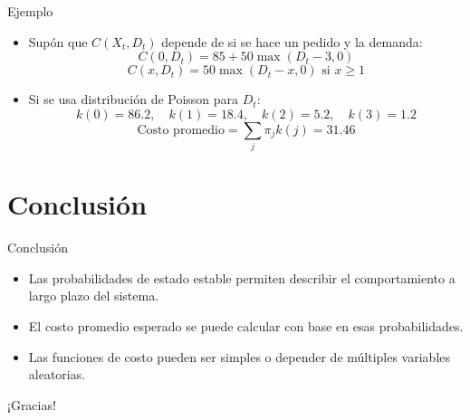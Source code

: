 \documentclass{beamer}
\begin{document}
\begin{frame}{Ejemplo}
\begin{itemize}
  \item Supón que $C(X_t, D_t)$ depende de si se hace un pedido y la demanda:
  \[
  C(0, D_t) = 85 + 50 \max(D_t - 3, 0)
  \]
  \[
  C(x, D_t) = 50 \max(D_t - x, 0) \text{ si } x \geq 1
  \]
  \item Si se usa distribución de Poisson para $D_t$:
  \[
  k(0) = 86.2, \quad k(1) = 18.4, \quad k(2) = 5.2, \quad k(3) = 1.2
  \]
  \[
  \text{Costo promedio} = \sum_j \pi_j k(j) = 31.46
  \]
\end{itemize}
\end{frame}


\section{Conclusión}

\begin{frame}{Conclusión}
\begin{itemize}
  \item Las probabilidades de estado estable permiten describir el comportamiento a largo plazo del sistema.
  \item El costo promedio esperado se puede calcular con base en esas probabilidades.
  \item Las funciones de costo pueden ser simples o depender de múltiples variables aleatorias.
\end{itemize}
\end{frame}

\begin{frame}
\centering
\Huge ¡Gracias!
\end{frame}
\end{document}
